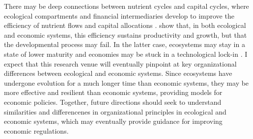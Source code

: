 % 
% 
% 
There may be deep connections between nutrient cycles and capital cycles, where ecological compartments and financial intermediaries develop to improve the efficiency of nutrient flows and capital allocations \citep{Odum1969}.
% 
\cite{Veldhuis2018,King1993} show that, in both ecological and economic systems, this efficiency sustains productivity and growth, but that the developmental process may fail. In the latter case, ecosystems may stay in a state of lower maturity \citep{Margalef1963} and economies may be stuck in a technological lock-in \citep{C.A.HidalgoB.Klinger}. 
% 
% 
% 
% 
I expect that this research venue will eventually pinpoint at key organizational differences between ecological and economic systems. Since ecosystems have undergone evolution for a much longer time than economic systems, they may be more effective and resilient than economic systems, providing models for economic policies.
% 
% 
% 
% 
% 
Together, future directions should seek to understand similarities and differencenes in organizational principles in ecological and economic systems, which may eventually provide guidance for improving economic regulations.

%   

